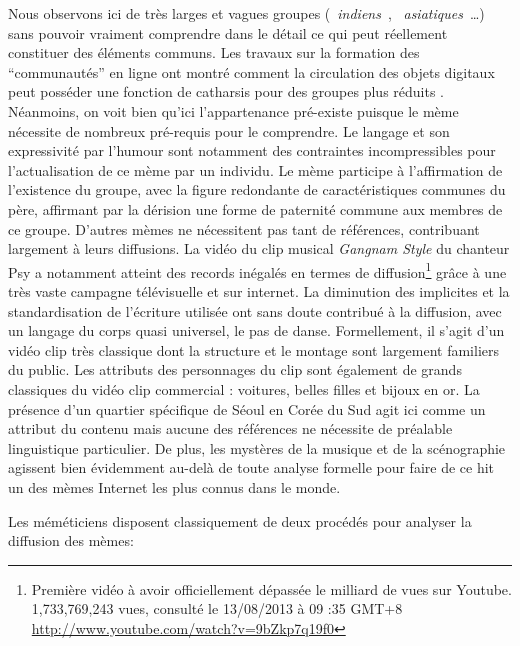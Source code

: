 Nous observons ici de très larges et vagues groupes ({\guillemotleft}~\textit{indiens}~{\guillemotright}, {\guillemotleft}~\textit{asiatiques}~{\guillemotright}{\dots}) sans pouvoir vraiment comprendre dans le détail ce qui peut réellement constituer des éléments communs. Les travaux sur la formation des {\textquotedblleft}communautés{\textquotedblright} en ligne ont montré comment la circulation des objets digitaux peut posséder une fonction de catharsis pour des groupes plus réduits \citep{Steyer2006}. Néanmoins, on voit bien qu{\textquoteright}ici l{\textquoteright}appartenance pré-existe puisque le mème nécessite de nombreux pré-requis pour le comprendre. Le langage et son expressivité par l{\textquoteright}humour sont notamment des contraintes incompressibles pour l{\textquoteright}actualisation de ce mème par un individu. Le mème participe à l{\textquoteright}affirmation de l{\textquoteright}existence du groupe, avec la figure redondante de caractéristiques communes du père, affirmant par la dérision une forme de paternité commune aux membres de ce groupe. D{\textquoteright}autres mèmes ne nécessitent pas tant de références, contribuant largement à leurs diffusions. La vidéo du clip musical \textit{Gangnam Style} du chanteur Psy a notamment atteint des records inégalés en termes de diffusion\footnote{ Première vidéo à avoir officiellement dépassée le milliard de vues sur Youtube. 1,733,769,243 vues, consulté le 13/08/2013 à 09 :35 GMT+8 \url{http://www.youtube.com/watch?v=9bZkp7q19f0}} gr\^ace à une très vaste campagne télévisuelle et sur internet. La diminution des implicites et la standardisation de l{\textquoteright}écriture utilisée ont sans doute contribué à la diffusion, avec un langage du corps quasi universel, le pas de danse. Formellement, il s{\textquoteright}agit d{\textquoteright}un vidéo clip très classique dont la structure et le montage sont largement familiers du public. Les attributs des personnages du clip sont également de grands classiques du vidéo clip commercial : voitures, belles filles et bijoux en or. La présence d{\textquoteright}un quartier spécifique de Séoul en Corée du Sud agit ici comme un attribut du contenu mais aucune des références ne nécessite de préalable linguistique particulier. De plus, les mystères de la musique et de la scénographie agissent bien évidemment au-delà de toute analyse formelle pour faire de ce hit un des mèmes Internet les plus connus dans le monde. 

Les méméticiens disposent classiquement de deux procédés pour analyser la diffusion des mèmes: 

